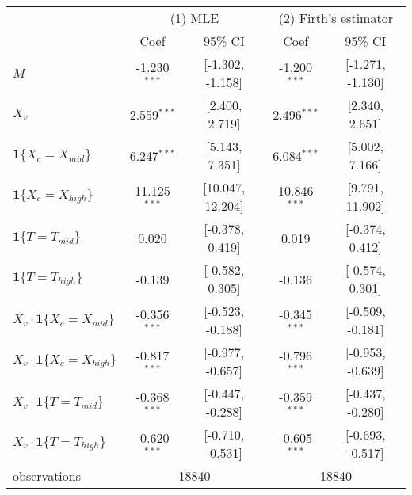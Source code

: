 \begin{tabular}{lcccc}
  \hline
   & \multicolumn{2}{c}{(1) MLE} & \multicolumn{2}{c}{(2) Firth's estimator} \\ & Coef & 95\% CI & Coef & 95\% CI \\ \hline
$M$ & -1.230$^{***}$ & [-1.302, -1.158] & -1.200$^{***}$ & [-1.271, -1.130] \\ 
  $X_v$ & 2.559$^{***}$ & [2.400, 2.719] & 2.496$^{***}$ & [2.340, 2.651] \\ 
  $\textbf{1}\{X_c = X_{mid}\}$ & 6.247$^{***}$ & [5.143, 7.351] & 6.084$^{***}$ & [5.002, 7.166] \\ 
  $\textbf{1}\{X_c = X_{high}\}$ & 11.125$^{***}$ & [10.047, 12.204] & 10.846$^{***}$ & [9.791, 11.902] \\ 
  $\textbf{1}\{T = T_{mid}\}$ & 0.020 & [-0.378, 0.419] & 0.019 & [-0.374, 0.412] \\ 
  $\textbf{1}\{T = T_{high}\}$ & -0.139 & [-0.582, 0.305] & -0.136 & [-0.574, 0.301] \\ 
  $X_v\cdot\textbf{1}\{X_c = X_{mid}\}$ & -0.356$^{***}$ & [-0.523, -0.188] & -0.345$^{***}$ & [-0.509, -0.181] \\ 
  $X_v\cdot\textbf{1}\{X_c = X_{high}\}$ & -0.817$^{***}$ & [-0.977, -0.657] & -0.796$^{***}$ & [-0.953, -0.639] \\ 
  $X_v\cdot\textbf{1}\{T = T_{mid}\}$ & -0.368$^{***}$ & [-0.447, -0.288] & -0.359$^{***}$ & [-0.437, -0.280] \\ 
  $X_v\cdot\textbf{1}\{T = T_{high}\}$ & -0.620$^{***}$ & [-0.710, -0.531] & -0.605$^{***}$ & [-0.693, -0.517] \\ 
   \hline observations & \multicolumn{2}{c}{18840} & \multicolumn{2}{c}{18840} \\ \hline
\end{tabular}

